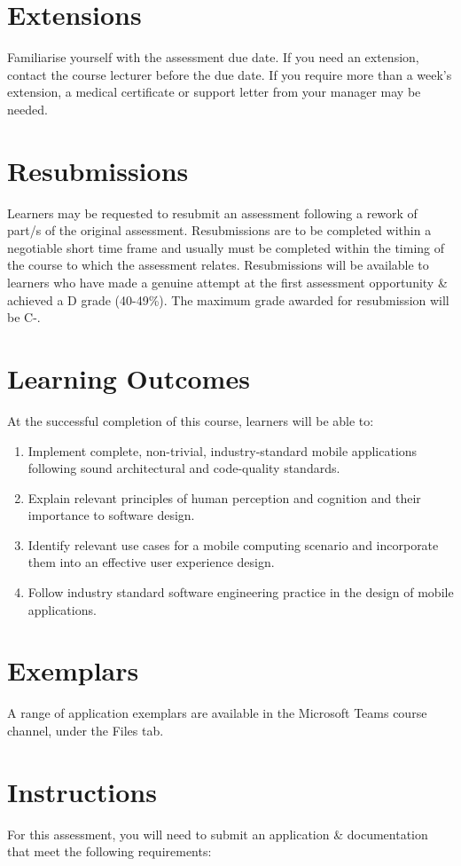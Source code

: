 \documentclass{article}
\begin{document}
\section*{Extensions}
Familiarise yourself with the assessment due date. If you need an extension, contact the course lecturer before the due date. If you require more than a week's extension, a medical certificate or support letter from your manager may be needed.

\section*{Resubmissions}
Learners may be requested to resubmit an assessment following a rework of part/s of the original assessment. Resubmissions are to be completed within a negotiable short time frame and usually must be completed within the timing of the course to which the assessment relates. Resubmissions will be available to learners who have made a genuine attempt at the first assessment opportunity \& achieved a D grade (40-49\%). The maximum grade awarded for resubmission will be C-.

\section*{Learning Outcomes}
At the successful completion of this course, learners will be able to:
\begin{enumerate}
	\item Implement complete, non-trivial, industry-standard mobile applications following sound architectural and code-quality standards.
	\item Explain relevant principles of human perception and cognition and their importance to software design.
	\item Identify relevant use cases for a mobile computing scenario and incorporate them into an effective user experience design.
	\item Follow industry standard software engineering practice in the design of mobile applications.
\end{enumerate}

\section*{Exemplars}
A range of application exemplars are available in the Microsoft Teams course channel, under the Files tab.

\newpage

\section*{Instructions} 
For this assessment, you will need to submit an application \& documentation that meet the following requirements:
\end{document}
